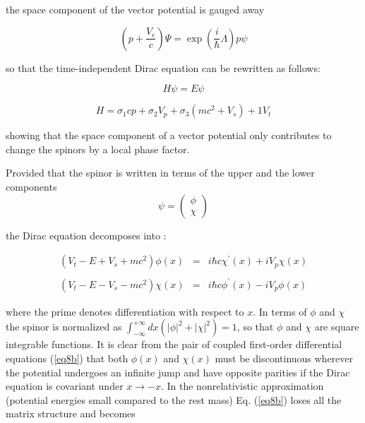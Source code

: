 \documentclass[a4paper,12pt,titlepage]{article}
\begin{document}
\noindent the space component of the vector potential is gauged away

\begin{equation}
\left( p+\frac{V_{e}}{c}\right) \Psi =\exp \left( \frac{i}{\hbar }\Lambda
\right) p\psi  \label{eq7}
\end{equation}

\noindent so that the time-independent Dirac equation can be rewritten as
follows:

\begin{equation}
H\psi =E\psi  \label{eq7a}
\end{equation}

\begin{equation}
H=\sigma _{1}cp+\sigma _{2}V_{p}+\sigma _{3}\left( mc^{2}+V_{s}\right)
+1V_{t}  \label{eq8}
\end{equation}

\noindent showing that the space component of a vector potential only
contributes to change the spinors by a local phase factor.

Provided that the spinor is written in terms of the upper and the lower
components 
\begin{equation}
\psi =\left( 
\begin{array}{c}
\phi \\ 
\chi
\end{array}
\right)  \label{eq8a}
\end{equation}

\noindent the Dirac equation decomposes into :

\begin{eqnarray}
\left( V_{t}-E+V_{s}+mc^{2}\right) \phi (x) &=&i\hbar c\chi ^{\prime
}(x)+iV_{p}\chi (x)  \nonumber \\
&&  \label{eq8b} \\
\left( V_{t}-E-V_{s}-mc^{2}\right) \chi (x) &=&i\hbar c\phi ^{\prime
}(x)-iV_{p}\phi (x)  \nonumber
\end{eqnarray}

\noindent where the prime denotes differentiation with respect to $x$. In
terms of $\phi $ and $\chi $ the spinor is normalized as $\int_{-\infty
}^{+\infty }dx\left( |\phi |^{2}+|\chi |^{2}\right) =1$, so that $\phi $ and 
$\chi $ are square integrable functions. It is clear from the pair of
coupled first-order differential equations (\ref{eq8b}) that both $\phi (x)$
and $\chi (x)$ must be discontinuous wherever the potential undergoes an
infinite jump and have opposite parities if the Dirac equation is covariant
under $x\rightarrow -x$. In the nonrelativistic approximation (potential
energies small compared to the rest mass) Eq. (\ref{eq8b}) loses all the
matrix structure and becomes
\end{document}
